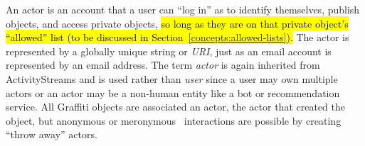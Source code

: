 An actor is an account that a user can ``log in'' as
to identify themselves, publish objects, and access private objects,
\hl{%
so long as they are on that private object's ``allowed'' list
(to be discussed in Section~{\ref{concepts:allowed-lists}}).
}%
The actor is represented by a globally unique string or \emph{URI},
just as an email account is represented by an email address.
The term \emph{actor} is again inherited from ActivityStreams
and is used rather than \emph{user} since a user may own
multiple actors or
an actor may be a non-human entity
like a bot or recommendation service.
All Graffiti objects are associated an actor, the actor
that created the object, but anonymous
or meronymous~\cite{meronymous} interactions are possible by
creating ``throw away'' actors.




